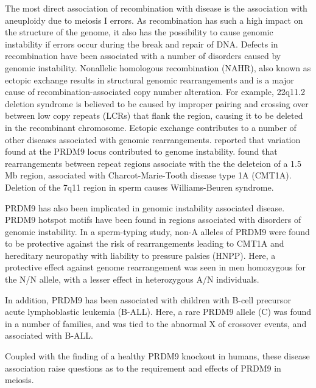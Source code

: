 The most direct association of recombination with disease is the association with aneuploidy due to meiosis I errors\cite{Hassold2001,Hassold2007}.
As recombination has such a high impact on the structure of the genome, it also has the possibility to cause genomic instability if errors occur during the break and repair of DNA.
Defects in recombination have been associated with a number of disorders caused by genomic instability.
Nonallelic homologous recombination (NAHR), also known as ectopic exchange results in structural genomic rearrangements and is a major cause of recombination-associated copy number alteration.
For example, 22q11.2 deletion syndrome is believed to be caused by improper pairing and crossing over between low copy repeats (LCRs) that flank the region, causing it to be deleted in the recombinant chromosome\cite{Emanuel2008}.
Ectopic exchange contributes to a number of other diseases associated with genomic rearrangements\cite{Stankiewicz2002,Liu2012}.
\citet{Berg2010} reported that variation found at the PRDM9 locus contributed to genome instability.
\citet{Pentao1992} found that rearrangements between repeat regions associate with the the deleteion of a 1.5 Mb region, associated with Charcot-Marie-Tooth disease type 1A (CMT1A).
Deletion of the 7q11 region in sperm causes Williams-Beuren syndrome\cite{Turner2008}.

PRDM9 has also been implicated in genomic instability associated disease.
PRDM9 hotspot motifs have been found in regions associated with disorders of genomic instability\cite{Myers2008}.
In a sperm-typing study, non-A alleles of PRDM9 were found to be protective against the risk of rearrangements leading to CMT1A and hereditary neuropathy with liability to pressure palsies (HNPP)\cite{Berg2010}.
Here, a protective effect against genome rearrangement was seen in men homozygous for the N/N allele, with a lesser effect in heterozygous A/N individuals.

In addition, PRDM9 has been associated with children with B-cell precursor acute lymphoblastic leukemia (B-ALL)\cite{Hussin2013}.
Here, a rare PRDM9 allele (C) was found in a number of families, and was tied to the abnormal X of crossover events, and associated with B-ALL.


Coupled with the finding of a healthy PRDM9 knockout in humans\cite{Narasimhan2016}, these disease association raise questions as to the requirement and effects of PRDM9 in meiosis.

